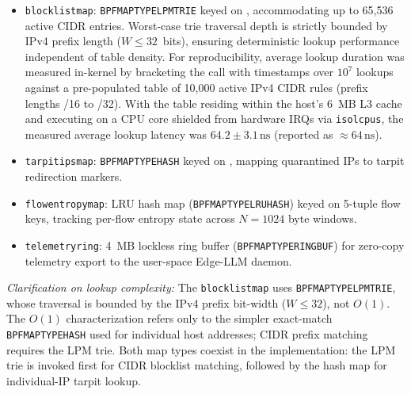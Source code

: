\documentclass{ieeeaccess}
\renewcommand{\_}{\textunderscore\allowbreak}
\begin{document}
\begin{itemize}
  \item \texttt{blocklist\_map}: \texttt{BPF\_MAP\_TYPE\_}\allowbreak\texttt{LPM\_TRIE} keyed on
    , accommodating up to 65{,}536 active CIDR entries.
    Worst-case trie traversal depth is strictly bounded by IPv4 prefix length ($W \le 32$~bits),
    ensuring deterministic lookup performance independent of table density. For reproducibility,
    average lookup duration was measured in-kernel by bracketing the 
    call with  timestamps over $10^7$ lookups against a
    pre-populated table of 10{,}000 active IPv4 CIDR rules (prefix lengths /16 to /32).
    With the table residing within the host's 6~MB L3 cache and executing on a CPU core
    shielded from hardware IRQs via \texttt{isolcpus}, the measured average lookup
    latency was $64.2 \pm 3.1\,\text{ns}$ (reported as ${\approx}64\,\text{ns}$).

  \item \texttt{tarpit\_ips\_map}: \texttt{BPF\_MAP\_TYPE\_HASH} keyed on
    , mapping quarantined IPs to tarpit redirection markers.

  \item \texttt{flow\_entropy\_map}: LRU hash map
    (\texttt{BPF\_MAP\_TYPE\_}\allowbreak\texttt{LRU\_HASH}) keyed on 5-tuple flow keys, tracking
    per-flow entropy state across $N = 1024$ byte windows.

  \item \texttt{telemetry\_ring}: 4~MB lockless ring buffer
    (\texttt{BPF\_MAP\_TYPE\_}\allowbreak\texttt{RINGBUF}) for zero-copy telemetry export to the
    user-space Edge-LLM daemon.
\end{itemize}

\textit{Clarification on lookup complexity:} The \texttt{blocklist\_map} uses
\texttt{BPF\_MAP\_TYPE\_LPM\_TRIE}, whose traversal is bounded by the IPv4 prefix bit-width
($W \le 32$), not $O(1)$. The $O(1)$ characterization refers only to the
simpler exact-match \texttt{BPF\_MAP\_TYPE\_HASH} used for individual host
addresses; CIDR prefix matching requires the LPM trie. Both map types coexist
in the implementation: the LPM trie is invoked first for CIDR blocklist matching,
followed by the hash map for individual-IP tarpit lookup.
\end{document}
